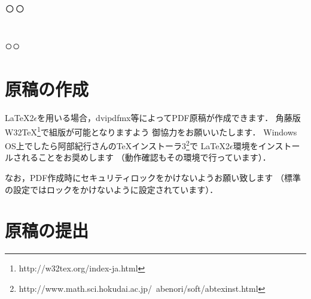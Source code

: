 \documentclass[dvipdfmx]{issj}
\begin{document}
\section{○○}  %
\subsection{○○}  %




\section{原稿の作成}  %

\LaTeX 2$\epsilon$を用いる場合，dvipdfmx等によってPDF原稿が作成できます．
角藤版W32{\TeX}\footnote{http://w32tex.org/index-ja.html}で組版が可能となりますよう
御協力をお願いいたします．
Windows OS上でしたら阿部紀行さんのTeXインストーラ3\footnote{%
http://www.math.sci.hokudai.ac.jp/~abenori/soft/abtexinst.html}で
\LaTeX 2$\epsilon$環境をインストールされることをお奨めします
（動作確認もその環境で行っています）．

なお，PDF作成時にセキュリティロックをかけないようお願い致します
（標準の設定ではロックをかけないように設定されています）．

\section{原稿の提出}  %
\end{document}
